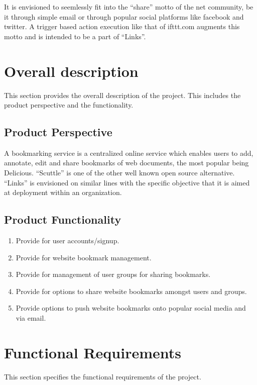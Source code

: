 \documentclass[11pt]{report} %
\begin{document}
It is envisioned to seemlessly fit into the “share” motto of the net community, be it through simple email or through popular social platforms like facebook and twitter. A trigger based action execution like that of ifttt.com augments this motto and is intended to be a part of “Links”.

\maketitle
\chapter{Overall description}
This section provides the overall description of the project. This includes the product perspective and the functionality.
\section{Product Perspective}
A bookmarking service is a centralized online service which enables users to add, annotate, edit and share bookmarks of web documents, the most popular being Delicious. “Scuttle” is one of the other well known open source alternative. “Links” is envisioned on similar lines with the specific objective that it is aimed at deployment within an organization.
\section{Product Functionality}
\begin{enumerate}
\item
Provide for user accounts/signup.
\item
Provide for website bookmark management.
\item
Provide for management of user groups for sharing bookmarks.
\item
Provide for options to share website bookmarks amongst users and groups.
\item
Provide options to push website bookmarks onto popular social media and via email.
\end{enumerate}

\maketitle
\chapter{Functional Requirements}
This section specifies the functional requirements of the project.
\end{document}
